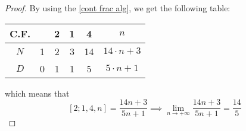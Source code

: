 \documentclass[a4paper, 12pt]{report}
\begin{document}
    \begin{proof}
        By using the \cref{cont frac alg}, we get the following table:

        \begin{center}
            \begin{tabular}{c|c|c|c|c|c} 
                C.F. & & 2 & 1 & 4 & $n$ \\
                \hline
                $N$ & 1 & 2 & 3 & 14 & $14 \cdot n + 3$ \\
                \hline
                $D$ & 0 & 1 & 1 & 5 & $5 \cdot n + 1$ \\
                \hline
            \end{tabular}
        \end{center}

        which means that $$[2; 1, 4, n] = \dfrac{14n + 3}{5n + 1} \implies \lim_{n \to + \infty}{\dfrac{14n + 3}{5n + 1}} = \dfrac{14}{5}$$
    \end{proof}
\end{document}
